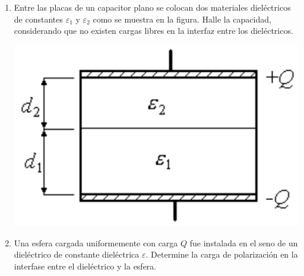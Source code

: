\documentclass[11pt,spanish,a4paper]{article}
\begin{document}
\begin{enumerate}
	\item \begin{minipage}[t][3cm]{0.7\textwidth}
		Entre las placas de un capacitor plano se colocan dos materiales dieléctricos de constantes \(\varepsilon_1\) y \(\varepsilon_2\) como se muestra en la figura.
		Halle la capacidad, considerando que no existen cargas libres en la interfaz entre los dieléctricos.
    \end{minipage}
    \begin{minipage}[c][1em][t]{0.25\textwidth}
            \includegraphics[width=\textwidth]{p2e10}
    \end{minipage}



\item Una esfera cargada uniformemente con carga \(Q\) fue instalada en el seno de un dieléctrico de constante dieléctrica \(\varepsilon\).
Determine la carga de polarización en la interfase entre el dieléctrico y la esfera.



\end{enumerate}
\end{document}
